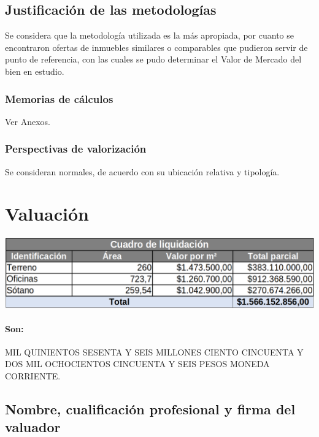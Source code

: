 \documentclass[12pt,a4paper,twoside]{article}
\begin{document}
\subsection{Justificación de las metodologías}

Se considera que la metodología utilizada es la más apropiada, por cuanto se encontraron ofertas de inmuebles similares o comparables que pudieron servir de punto de referencia, con las cuales se pudo determinar el Valor de Mercado del bien en estudio. 

\subsubsection{Memorias de cálculos}

Ver Anexos.

\subsubsection{Perspectivas de valorización}

Se consideran normales, de acuerdo con su ubicación relativa y tipología.


\newpage

\section{Valuación}

\begin{center}
	\includegraphics[width=\textwidth]{Imagenes/Valoracion1}
\end{center}

\paragraph{Son: } MIL QUINIENTOS SESENTA Y SEIS MILLONES CIENTO CINCUENTA Y DOS MIL OCHOCIENTOS CINCUENTA Y SEIS  PESOS MONEDA CORRIENTE.

\subsection{Nombre, cualificación profesional y firma del valuador}
\end{document}
